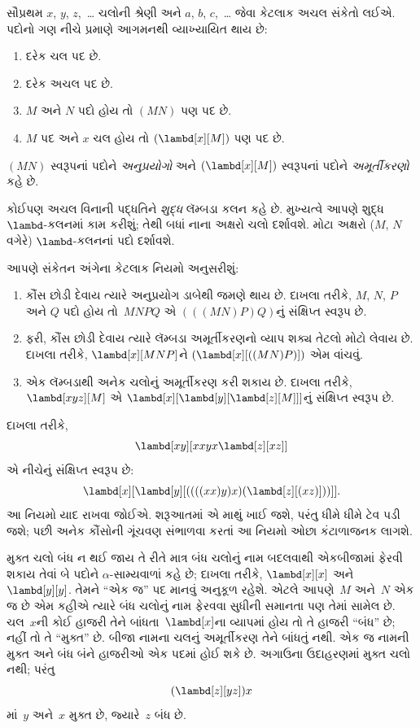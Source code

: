 \documentclass[../../../include/open-logic-section]{subfiles}
\begin{document}

સૌપ્રથમ $x$, $y$, $z$,~\dots{} ચલોની શ્રેણી અને
$a$, $b$, $c$,~\dots{} જેવા કેટલાક અચલ સંકેતો લઈએ. પદોનો ગણ
નીચે પ્રમાણે આગમનથી વ્યાખ્યાયિત થાય છે:
\begin{enumerate}
\item દરેક ચલ પદ છે.
\item દરેક અચલ પદ છે.
\item $M$ અને $N$ પદો હોય તો $(MN)$ પણ પદ છે.
\item $M$ પદ અને $x$ ચલ હોય તો $(\lambd[x][M])$ પણ પદ છે.
\end{enumerate}
$(MN)$ સ્વરૂપનાં પદોને \emph{અનુપ્રયોગો} અને
$(\lambd[x][M])$ સ્વરૂપનાં પદોને \emph{અમૂર્તીકરણો} કહે છે.

કોઈપણ અચલ વિનાની પદ્ધતિને \emph{શુદ્ધ} લૅમ્બડા કલન કહે છે.
મુખ્યત્વે આપણે શુદ્ધ~$\lambd$-કલનમાં કામ કરીશું; તેથી બધાં નાના
અક્ષરો ચલો દર્શાવશે. મોટા અક્ષરો ($M$, $N$ વગેરે) $\lambd$-કલનનાં
પદો દર્શાવશે.

આપણે સંકેતન અંગેના કેટલાક નિયમો અનુસરીશું:

\begin{conv}
\begin{enumerate}
\item કૌંસ છોડી દેવાય ત્યારે અનુપ્રયોગ ડાબેથી જમણે થાય છે.
  દાખલા તરીકે, $M$, $N$, $P$ અને $Q$ પદો હોય તો~$MNPQ$ એ
  $(((MN)P)Q)$નું સંક્ષિપ્ત સ્વરૂપ છે.
\item ફરી, કૌંસ છોડી દેવાય ત્યારે લૅમ્બડા અમૂર્તીકરણનો વ્યાપ
  શક્ય તેટલો મોટો લેવાય છે. દાખલા તરીકે, $\lambd[x][MNP]$ને
  $(\lambd[x][((MN)P)])$ એમ વાંચવું.
\item એક લૅમ્બડાથી અનેક ચલોનું અમૂર્તીકરણ કરી શકાય છે.
  દાખલા તરીકે, $\lambd[xyz][M]$ એ
  $\lambd[x][\lambd[y][\lambd[z][M]]]$નું સંક્ષિપ્ત સ્વરૂપ છે.
\end{enumerate}
\end{conv}

દાખલા તરીકે,
\[
\lambd[xy][xxyx \lambd[z][xz]]
\]
એ નીચેનું સંક્ષિપ્ત સ્વરૂપ છે:
\[
\lambd[x][\lambd[y][((((xx)y)x)(\lambd[z][(xz)]))]].
\]
આ નિયમો યાદ રાખવા જોઈએ. શરૂઆતમાં એ માથું ખાઈ જશે, પરંતુ
ધીમે ધીમે ટેવ પડી જશે; પછી અનેક કૌંસોની ગૂંચવણ સંભાળવા કરતાં
આ નિયમો ઓછા કંટાળાજનક લાગશે.

મુક્ત ચલો બંધ ન થઈ જાય તે રીતે માત્ર બંધ ચલોનું નામ બદલવાથી
એકબીજામાં ફેરવી શકાય તેવાં બે પદોને
$\alpha$-સામ્યવાળાં કહે છે; દાખલા તરીકે, $\lambd[x][x]$ અને
$\lambd[y][y]$. તેમને ``એક જ'' પદ માનવું અનુકૂળ રહેશે.
એટલે આપણે~$M$ અને~$N$ એક જ છે એમ કહીએ ત્યારે બંધ ચલોનું નામ
ફેરવવા સુધીની સમાનતા પણ તેમાં સામેલ છે. ચલ~$x$ની કોઈ હાજરી
તેને બાંધતા~$\lambd[x]$ના વ્યાપમાં હોય તો તે હાજરી ``બંધ'' છે;
નહીં તો તે ``મુક્ત'' છે. બીજા નામના ચલનું અમૂર્તીકરણ તેને બાંધતું નથી.
એક જ નામની મુક્ત અને બંધ બંને હાજરીઓ એક પદમાં હોઈ શકે છે.
અગાઉના ઉદાહરણમાં
મુક્ત ચલો નથી; પરંતુ
\[
(\lambd[z][yz])x
\]
માં~$y$ અને~$x$ મુક્ત છે, જ્યારે~$z$ બંધ છે.
\end{document}
